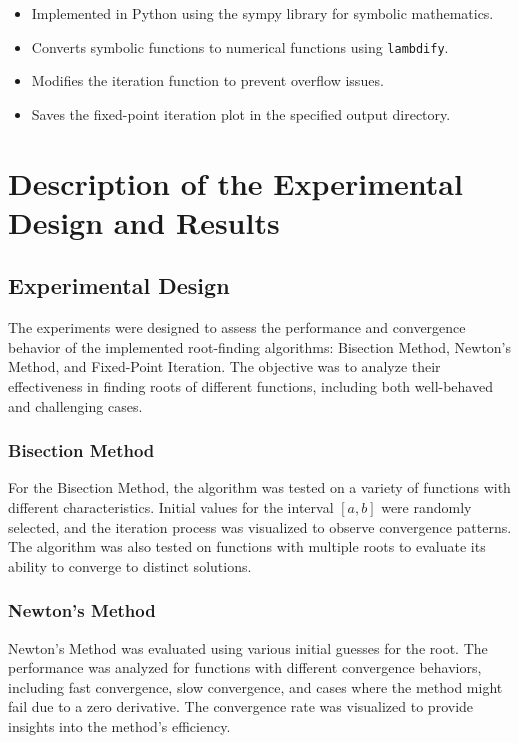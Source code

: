 \documentclass[12pt, letterpaper]{article}
\begin{document}
\begin{itemize}
    \item Implemented in Python using the sympy library for symbolic mathematics.
    \item Converts symbolic functions to numerical functions using \texttt{lambdify}.
    \item Modifies the iteration function to prevent overflow issues.
    \item Saves the fixed-point iteration plot in the specified output directory.
\end{itemize}


\section{Description of the Experimental Design and Results}

\subsection*{Experimental Design}

The experiments were designed to assess the performance and convergence behavior of the implemented root-finding algorithms: Bisection Method, Newton's Method, and Fixed-Point Iteration. The objective was to analyze their effectiveness in finding roots of different functions, including both well-behaved and challenging cases.

\subsubsection*{Bisection Method}

For the Bisection Method, the algorithm was tested on a variety of functions with different characteristics. Initial values for the interval \( [a, b] \) were randomly selected, and the iteration process was visualized to observe convergence patterns. The algorithm was also tested on functions with multiple roots to evaluate its ability to converge to distinct solutions.

\subsubsection*{Newton's Method}

Newton's Method was evaluated using various initial guesses for the root. The performance was analyzed for functions with different convergence behaviors, including fast convergence, slow convergence, and cases where the method might fail due to a zero derivative. The convergence rate was visualized to provide insights into the method's efficiency.
\end{document}
